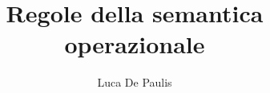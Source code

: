 \documentclass[italian,oneside,headinclude,10pt]{scrartcl}
\begin{document}
\author{Luca De Paulis}
\title{Regole della semantica operazionale}
\date{\vspace{-4ex}}
\maketitle


\end{document}

